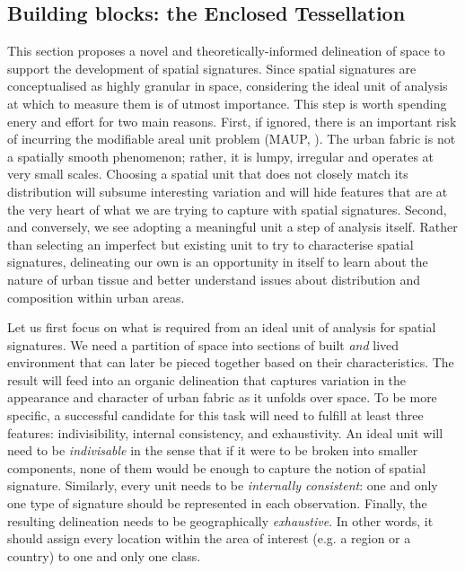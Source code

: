 \subsection{Building blocks: the Enclosed Tessellation}
\label{ssec:ss_et}

This section proposes a novel and theoretically-informed delineation of space to
support the development of spatial signatures.
Since spatial signatures are conceptualised as highly granular in space,
considering the ideal unit of analysis at which to measure them is of utmost
importance.
%
This step is worth spending enery and effort for two main reasons.
First, if ignored, there is an important risk of incurring the modifiable areal
unit problem (MAUP, \citealp{openshaw1981modifiable}). The urban fabric is not a
spatially smooth phenomenon; rather, it is lumpy, irregular and operates at very
small scales.
%
Choosing a spatial unit that does not closely match its distribution will
subsume interesting variation and will hide features that are at the very heart
of what we are trying to capture with spatial signatures.
Second, and conversely, we see adopting a meaningful unit a step of analysis
itself. Rather than selecting an imperfect but existing unit to try to
characterise spatial signatures, delineating our own is an opportunity in itself
to learn about the nature of urban tissue and better understand issues about
distribution and composition within urban areas.

Let us first focus on what is required from an ideal unit of analysis for
spatial signatures. We need a partition of space into sections of built
\textit{and} lived environment that can later be pieced together based on their
characteristics. The result will feed into an organic delineation that captures
variation in the appearance and character of urban fabric as it unfolds over
space.
%
To be more specific, a successful candidate for this task will need to fulfill
at least three features: indivisibility, internal consistency, and exhaustivity.
An ideal unit will need to be \textit{indivisable} in the sense that if it were
to be broken into smaller components, none of them would be enough to capture
the notion of spatial signature.
Similarly, every unit needs to be \textit{internally consistent}: one and only
one type of signature should be represented in each observation.
Finally, the resulting delineation needs to be geographically
\textit{exhaustive}. In other words, it should assign every location within the
area of interest (e.g. a region or a country) to one and only one class.


